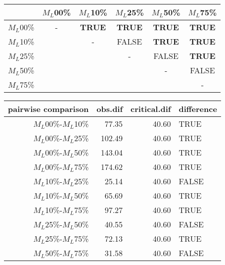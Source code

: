 \begin{tabular}{c|ccccc}
    \hline
              & $M_L$00\% & $M_L$10\% & $M_L$25\% & $M_L$50\% & $M_L$75\% \\
    \hline
    $M_L$00\% & - & \textbf{TRUE} & \textbf{TRUE} & \textbf{TRUE} & \textbf{TRUE}\\
    $M_L$10\% & & - & FALSE & \textbf{TRUE} & \textbf{TRUE} \\
    $M_L$25\% & & & - & FALSE & \textbf{TRUE} \\
    $M_L$50\% & & & & - & FALSE \\
    $M_L$75\% & & & & & - \\
    \hline
\end{tabular}
\centering
\begin{tabular}{rrrl}
 pairwise comparison & obs.dif & critical.dif & difference \\
  \hline
  $M_L$00\%-$M_L$10\% & 77.35 & 40.60 & TRUE \\ 
  $M_L$00\%-$M_L$25\% & 102.49 & 40.60 & TRUE \\ 
  $M_L$00\%-$M_L$50\% & 143.04 & 40.60 & TRUE \\ 
  $M_L$00\%-$M_L$75\% & 174.62 & 40.60 & TRUE \\
  $M_L$10\%-$M_L$25\% & 25.14 & 40.60 & FALSE \\
  $M_L$10\%-$M_L$50\% & 65.69 & 40.60 & TRUE \\ 
  $M_L$10\%-$M_L$75\% & 97.27 & 40.60 & TRUE \\ 
  $M_L$25\%-$M_L$50\% & 40.55 & 40.60 & FALSE \\ 
  $M_L$25\%-$M_L$75\% & 72.13 & 40.60 & TRUE \\
  $M_L$50\%-$M_L$75\% & 31.58 & 40.60 & FALSE \\ 
   \hline
\end{tabular}
